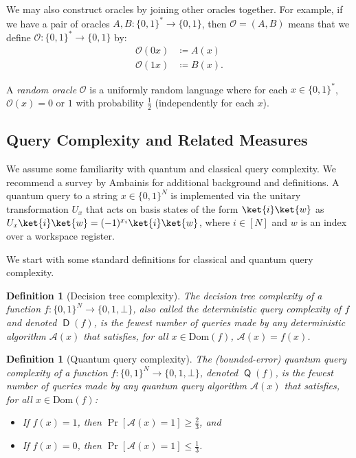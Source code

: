 \documentclass[10pt,a4paper]{article}
\newtheorem{definition}[theorem]{Definition}
\newcommand{\Dom}{\mathrm{Dom}}
\DeclareMathOperator{\D}{\mathsf{D}}
\DeclareMathOperator{\Q}{\mathsf{Q}}
\begin{document}
We may also construct oracles by joining other oracles together. For example, if we have a pair of oracles $A, B: \{0,1\}^* \to \{0,1\}$, then $\mathcal{O} = (A, B)$ means that we define $\mathcal{O}: \{0,1\}^* \to \{0,1\}$ by:
\begin{align*}
\mathcal{O}(0x) &\coloneqq A(x)\\
\mathcal{O}(1x) &\coloneqq B(x).
\end{align*}

A \textit{random oracle} $\mathcal{O}$ is a uniformly random language where for each $x \in \{0,1\}^*$, $\mathcal{O}(x) = 0$ or $1$ with probability $\frac{1}{2}$ (independently for each $x$).



\subsection{Query Complexity and Related Measures}
We assume some familiarity with quantum and classical query complexity. We recommend a survey by Ambainis \cite{Amb18} for additional background and definitions. A quantum query to a string $x \in \{0,1\}^N$ is implemented via the unitary transformation $U_x$ that acts on basis states of the form $\ket{i}\ket{w}$ as $U_x\ket{i}\ket{w} = (-1)^{x_i}\ket{i}\ket{w}$, where $i \in [N]$ and $w$ is an index over a workspace register.


We start with some standard definitions for classical and quantum query complexity.

\begin{definition}[Decision tree complexity]
The \emph{decision tree complexity} of a function $f: \{0,1\}^N \to \{0,1, \bot\}$, also called the \emph{deterministic query complexity} of $f$ and denoted $\D(f)$, is the fewest number of queries made by any deterministic algorithm $\mathcal{A}(x)$ that satisfies, for all $x \in \Dom(f)$, $\mathcal{A}(x) = f(x)$.
\end{definition}

\begin{definition}[Quantum query complexity]
The \emph{(bounded-error) quantum query complexity} of a function $f: \{0,1\}^N \to \{0,1,\bot\}$, denoted $\Q(f)$, is the fewest number of queries made by any quantum query algorithm $\mathcal{A}(x)$ that satisfies, for all $x \in \Dom(f)$:
\begin{itemize}
\item If $f(x) = 1$, then $\Pr\left[\mathcal{A}(x) = 1 \right] \ge \frac{2}{3}$, and
\item If $f(x) = 0$, then $\Pr\left[\mathcal{A}(x) = 1 \right] \le \frac{1}{3}$.
\end{itemize}
\end{definition}
\end{document}
